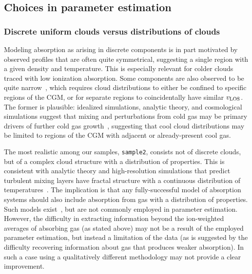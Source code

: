 \documentclass[fleqn,usenatbib]{mnras}
\begin{document}
\subsection{Choices in parameter estimation}
\label{s: discussion -- modeling choices}

\subsubsection{Discrete uniform clouds versus distributions of clouds}

Modeling absorption as arising in discrete components is in part motivated by observed profiles that are often quite symmetrical,
suggesting a single region with a given density and temperature. 
This is especially relevant for colder clouds traced with low ionization absorption.
Some components are also observed to be quite narrow~\citep[e.g.][]{churchill1999Population, churchill2001Kinematics}, 
which requires cloud distributions to either be confined to specific regions of the CGM,
or for separate regions to coincidentally have similar $v_{\rm LOS}$.
The former is plausible:
idealized simulations, analytic theory, and cosmological simulations suggest that mixing and perturbations from cold gas may be primary drivers of further cold gas growth~\citep[e.g.][]{nelson2020Resolving, esmerian2021Thermal, gronke2021Survival, gronke2022Cooling, ramesh2022Circumgalactic},
suggesting that cool cloud distributions may be limited to regions of the CGM with adjacent or already-present cool gas.

The most realistic among our samples, \texttt{sample2}, consists not of discrete clouds, but of a complex cloud structure with a distribution of properties.
This is consistent with analytic theory and high-resolution simulations that predict turbulent mixing layers have fractal structure with a continuous distribution of temperatures~\citep[e.g.][]{Tan2021Model}.
The implication is that any fully-successful model of absorption systems should also include absorption from gas with a distribution of properties.
Such models exist~\citep[e.g.][]{stern2016Universal}, but are not commonly employed in parameter estimation.
However, the difficulty in extracting information beyond the ion-weighted averages of absorbing gas (as stated above) may not be a result of the employed parameter estimation,
but instead a limitation of the data (as is suggested by the difficulty recovering information about gas that produces weaker absorption).
In such a case using a qualitatively different methodology may not provide a clear improvement.
\end{document}

